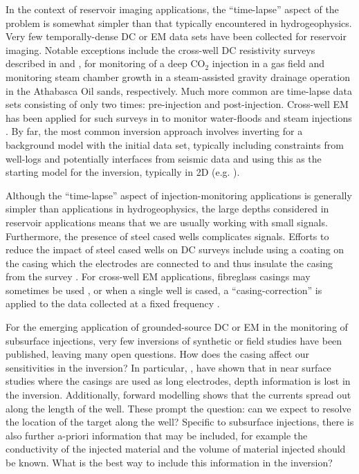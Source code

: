 In the context of reservoir imaging applications, the ``time-lapse'' aspect of the problem is somewhat simpler than that typically encountered in hydrogeophysics. Very few temporally-dense DC or EM data sets have been collected for reservoir imaging. Notable exceptions include the cross-well DC resistivity surveys described in \cite{Carrigan2013} and \cite{Tondel2014}, for monitoring of a deep CO$_2$ injection in a gas field and monitoring steam chamber growth in a steam-assisted gravity drainage operation in the Athabasca Oil sands, respectively. Much more common are time-lapse data sets consisting of only two times: pre-injection and post-injection. Cross-well EM has been applied for such surveys in to monitor water-floods \citep{Wilt2005, Wilt2012} and steam injections \citep{Wilt1996, Wilt1997, Marion2011}. By far, the most common inversion approach involves inverting for a background model with the initial data set, typically including constraints from well-logs and potentially interfaces from seismic data and using this as the starting model for the inversion, typically in 2D (e.g. \cite{Wilt2012}).

Although the ``time-lapse'' aspect of injection-monitoring applications is generally simpler than applications in hydrogeophysics, the large depths considered in reservoir applications means that we are usually working with small signals. Furthermore, the presence of steel cased wells complicates signals. Efforts to reduce the impact of steel cased wells on DC surveys include using a coating on the casing which the electrodes are connected to and thus insulate the casing from the survey \citep{Tondel2014}. For cross-well EM applications, fibreglass casings may sometimes be used \citep{Wilt2012}, or when a single well is cased, a ``casing-correction'' is applied to the data collected at a fixed frequency \citep{Augustin1989a, Becker1997}.

For the emerging application of grounded-source DC or EM in the monitoring of subsurface injections, very few inversions of synthetic or field studies have been published, leaving many open questions. How does the casing affect our sensitivities in the inversion? In particular, \cite{Rucker2012}, have shown that in near surface studies where the casings are used as long electrodes, depth information is lost in the inversion. Additionally, forward modelling shows that the currents spread out along the length of the well. These prompt the question: can we expect to resolve the location of the target along the well? Specific to subsurface injections, there is also further a-priori information that may be included, for example the conductivity of the injected material and the volume of material injected should be known. What is the best way to include this information in the inversion?

